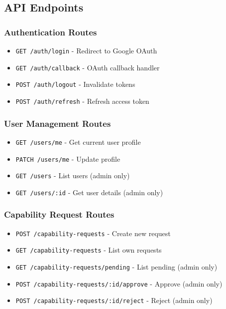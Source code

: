 \documentclass[12pt,a4paper]{article}
\begin{document}
\subsection{API Endpoints}

\subsubsection{Authentication Routes}
\begin{itemize}
    \item \texttt{GET /auth/login} - Redirect to Google OAuth
    \item \texttt{GET /auth/callback} - OAuth callback handler
    \item \texttt{POST /auth/logout} - Invalidate tokens
    \item \texttt{POST /auth/refresh} - Refresh access token
\end{itemize}

\subsubsection{User Management Routes}
\begin{itemize}
    \item \texttt{GET /users/me} - Get current user profile
    \item \texttt{PATCH /users/me} - Update profile
    \item \texttt{GET /users} - List users (admin only)
    \item \texttt{GET /users/:id} - Get user details (admin only)
\end{itemize}

\subsubsection{Capability Request Routes}
\begin{itemize}
    \item \texttt{POST /capability-requests} - Create new request
    \item \texttt{GET /capability-requests} - List own requests
    \item \texttt{GET /capability-requests/pending} - List pending (admin only)
    \item \texttt{POST /capability-requests/:id/approve} - Approve (admin only)
    \item \texttt{POST /capability-requests/:id/reject} - Reject (admin only)
\end{itemize}
\end{document}
